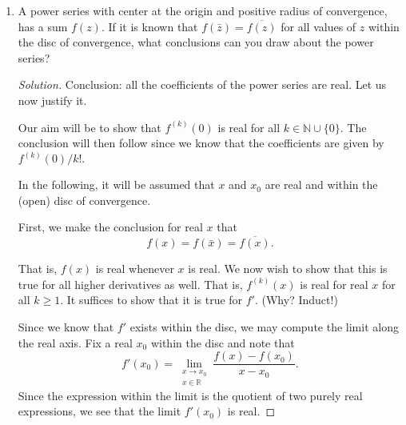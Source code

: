 \documentclass[12pt]{article}
\theoremstyle{definition}
\numberwithin{thm}{section}
\newenvironment{soln}{\begin{proof}[Solution]}{\end{proof}}
\begin{document}
\begin{enumerate}
\begin{soln}
		Armed with the above information, we can break up the desired integral as the sum of integrals around each pole and apply Cauchy residue theorem as follows
		\begin{align*} 
			\int_{|z| = R}^{} \dfrac{z^n}{z^m - 1} {\mathrm{d}}z &= \sum_{k=0}^{m-1}\int_{|z-\zeta^k| = \epsilon}^{}\dfrac{z^n}{z^m - 1} {\mathrm{d}}z\\
			&= \sum_{k=0}^{m-1}\int_{|z-\zeta^k| = \epsilon}^{}\dfrac{z^n/p_k(z)}{z - \zeta^k} {\mathrm{d}}z\\
			&= \sum_{k=0}^{m-1}{\color{red}2\pi\iota}\dfrac{\zeta^{nk}}{p_k(\zeta^k)}\\
			&= \dfrac{2\pi\iota}{m}\sum_{k=0}^{m-1}\zeta^{(n-m+1)k}\\
			&= \dfrac{2\pi\iota}{m}\cdot\dfrac{1 - (\zeta^{n-m+1})^m}{1 - \zeta^{n-m+1}}\\
			&= 0. \qedhere
		\end{align*}
	\end{soln}
	\item A power series with center at the origin and positive radius of convergence, has a sum $f(z).$ If it is known that $f(\bar{z}) = \overline{f(z)}$ for all values of $z$ within the disc of convergence, what conclusions can you draw about the power series?
	\begin{soln}
		Conclusion: all the coefficients of the power series are real. Let us now justify it.

		Our aim will be to show that $f^{(k)}(0)$ is real for all $k \in \mathbb{N}\cup\{0\}.$ The conclusion will then follow since we know that the coefficients are given by $f^{(k)}(0)/k!.$

		In the following, it will be assumed that $x$ and $x_0$ are real and within the (open) disc of convergence.

		First, we make the conclusion for real $x$ that
		\begin{equation*} 
			f(x) = f(\bar{x}) = \overline{f(x)}.
		\end{equation*}

		That is, $f(x)$ is real whenever $x$ is real. We now wish to show that this is true for all higher derivatives as well. That is, $f^{(k)}(x)$ is real for real $x$ for all $k \ge 1.$ It suffices to show that it is true for $f'.$ \hfill (Why? Induct!)

		Since we know that $f'$ exists within the disc, we may compute the limit along the real axis. Fix a real $x_0$ within the disc and note that
		\begin{equation*} 
			f'(x_0) = \lim_{\substack{x\to x_0\\x\in\mathbb{R}}}\dfrac{f(x) - f(x_0)}{x - x_0}.
		\end{equation*}
		Since the expression within the limit is the quotient of two purely real expressions, we see that the limit $f'(x_0)$ is real.


\end{soln}
\end{enumerate}
\end{document}
